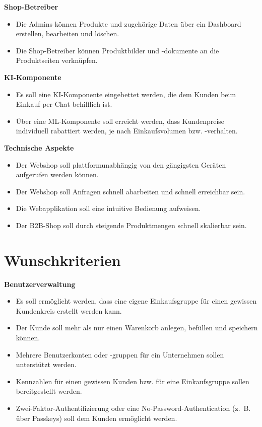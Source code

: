 \documentclass[%
	12pt,
	a4paper,
	oneside,
	parskip=full
]{scrbook}
\begin{document}
	\vspace{0.5cm}
	\textbf{Shop-Betreiber}
	\begin{itemize}
		\item Die Admins können Produkte und zugehörige Daten über ein Dashboard erstellen, bearbeiten und löschen.
		\item Die Shop-Betreiber können Produktbilder und -dokumente an die Produktseiten verknüpfen.
	\end{itemize}

	\vspace{0.5cm}
	\textbf{KI-Komponente}
	\begin{itemize}
		\item Es soll eine KI-Komponente eingebettet werden, die dem Kunden beim Einkauf per Chat behilflich ist.
		\item Über eine ML-Komponente soll erreicht werden, dass Kundenpreise individuell rabattiert werden, je nach Einkaufsvolumen bzw. -verhalten.
	\end{itemize}

	\vspace{0.5cm}
	\textbf{Technische Aspekte}
	\begin{itemize}
		\item Der Webshop soll plattformunabhängig von den gängigsten Geräten aufgerufen werden können.
		\item Der Webshop soll Anfragen schnell abarbeiten und schnell erreichbar sein.
		\item Die Webapplikation soll eine intuitive Bedienung aufweisen.
		\item Der B2B-Shop soll durch steigende Produktmengen schnell skalierbar sein.
	\end{itemize}

\section{Wunschkriterien}
	\vspace{0.5cm}
	\textbf{Benutzerverwaltung}
	\begin{itemize}
		\item Es soll ermöglicht werden, dass eine eigene Einkaufsgruppe für einen gewissen Kundenkreis erstellt werden kann.
		\item Der Kunde soll mehr als nur einen Warenkorb anlegen, befüllen und speichern können.
		\item Mehrere Benutzerkonten oder -gruppen für ein Unternehmen sollen unterstützt werden.
		\item Kennzahlen für einen gewissen Kunden bzw. für eine Einkaufsgruppe sollen bereitgestellt werden.
		\item Zwei-Faktor-Authentifizierung oder eine No-Password-Authentication (z.~B. über Passkeys) soll dem Kunden ermöglicht werden.
	\end{itemize}
\end{document}

